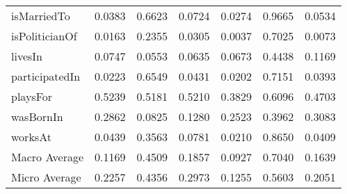 \begin{table}
\begin{center}
\begin{tabular}{|l||c|c|c||c|c|c|}
        isMarriedTo & 0.0383 & 0.6623 & 0.0724 & 0.0274 & 0.9665 & 0.0534 \\
        isPoliticianOf & 0.0163 & 0.2355 & 0.0305 & 0.0037 & 0.7025 & 0.0073 \\
        livesIn & 0.0747 & 0.0553 & 0.0635 & 0.0673 & 0.4438 & 0.1169 \\
        participatedIn & 0.0223 & 0.6549 & 0.0431 & 0.0202 & 0.7151 & 0.0393 \\
        playsFor & 0.5239 & 0.5181 & 0.5210 & 0.3829 & 0.6096 & 0.4703 \\
        wasBornIn & 0.2862 & 0.0825 & 0.1280 & 0.2523 & 0.3962 & 0.3083 \\
        worksAt & 0.0439 & 0.3563 & 0.0781 & 0.0210 & 0.8650 & 0.0409 \\ 
        \hline
        Macro Average & 0.1169 & 0.4509 & 0.1857 & 0.0927 & 0.7040 & 0.1639 \\
        Micro Average & 0.2257 & 0.4356 & 0.2973 & 0.1255 & 0.5603 & 0.2051 \\
        \hline
        \end{tabular}
    \end{center}
\end{table}
